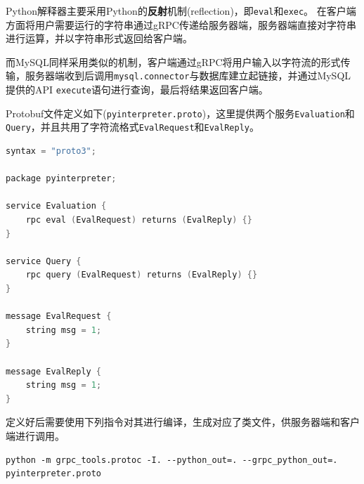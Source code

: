 \documentclass[logo,reportComp]{thesis}
\begin{document}
Python解释器主要采用Python的\textbf{反射}机制(reflection)，即\verb'eval'和\verb'exec'。
在客户端方面将用户需要运行的字符串通过gRPC传递给服务器端，服务器端直接对字符串进行运算，并以字符串形式返回给客户端。

而MySQL同样采用类似的机制，客户端通过gRPC将用户输入以字符流的形式传输，服务器端收到后调用\verb'mysql.connector'与数据库建立起链接，并通过MySQL提供的API \verb'execute'语句进行查询，最后将结果返回客户端。

Protobuf文件定义如下(\verb'pyinterpreter.proto')，这里提供两个服务\verb'Evaluation'和\verb'Query'，并且共用了字符流格式\verb'EvalRequest'和\verb'EvalReply'。
\begin{lstlisting}[language=c++]
syntax = "proto3";

package pyinterpreter;

service Evaluation {
	rpc eval (EvalRequest) returns (EvalReply) {}
}

service Query {
	rpc query (EvalRequest) returns (EvalReply) {}
}

message EvalRequest {
	string msg = 1;
}

message EvalReply {
	string msg = 1;
}
\end{lstlisting}
定义好后需要使用下列指令对其进行编译，生成对应了类文件，供服务器端和客户端进行调用。
\begin{lstlisting}
python -m grpc_tools.protoc -I. --python_out=. --grpc_python_out=. pyinterpreter.proto
\end{lstlisting}
\end{document}
